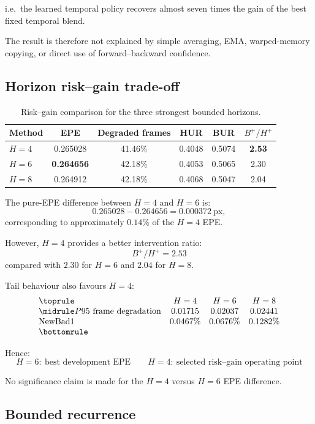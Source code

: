 \documentclass[11pt,a4paper]{article}
\begin{document}
i.e.\ the learned temporal policy recovers almost seven times the gain
of the best fixed temporal blend.

The result is therefore not explained by simple averaging, EMA,
warped-memory copying, or direct use of forward--backward confidence.

\subsection*{Horizon risk--gain trade-off}

\begin{table}[h]
\centering
\small
\begin{tabular}{lccccc}
\toprule
Method & EPE & Degraded frames & HUR & BUR & $B^+/H^+$ \\
\midrule
$H=4$ & 0.265028 & 41.46\% & 0.4048 & 0.5074 & \textbf{2.53} \\
$H=6$ & \textbf{0.264656} & 42.18\% & 0.4053 & 0.5065 & 2.30 \\
$H=8$ & 0.264912 & 42.18\% & 0.4068 & 0.5047 & 2.04 \\
\bottomrule
\end{tabular}
\caption{Risk--gain comparison for the three strongest bounded horizons.}
\end{table}

The pure-EPE difference between $H=4$ and $H=6$ is:
\[
0.265028 - 0.264656
=
\boxed{0.000372~\mathrm{px}},
\]
corresponding to approximately $0.14\%$ of the $H=4$ EPE.

However, $H=4$ provides a better intervention ratio:
\[
\boxed{
B^+/H^+ = 2.53
}
\]
compared with $2.30$ for $H=6$ and $2.04$ for $H=8$.

Tail behaviour also favours $H=4$:
\[
\begin{array}{lccc}
\toprule
 & H=4 & H=6 & H=8 \\
\midrule
P95\ \mathrm{frame\ degradation} &
0.01715 &
0.02037 &
0.02441 \\
\mathrm{NewBad1} &
0.0467\% &
0.0676\% &
0.1282\% \\
\bottomrule
\end{array}
\]

Hence:
\[
\boxed{
H=6:\ \text{best development EPE}
\qquad
H=4:\ \text{selected risk--gain operating point}
}
\]

No significance claim is made for the $H=4$ versus $H=6$ EPE difference.

\subsection*{Bounded recurrence}
\end{document}
